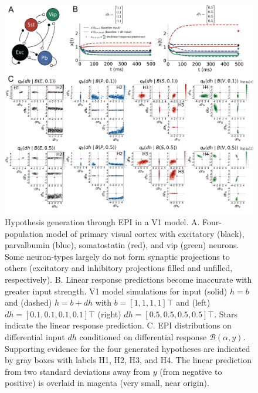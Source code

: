 \documentclass[11pt]{article}
\begin{document}
\begin{figure}
\begin{center}
\includegraphics[scale=0.55]{figures/fig2/fig2.pdf}
\end{center}
\caption{Hypothesis generation through EPI in a V1 model.  A. Four-population model of primary visual cortex with excitatory (black), parvalbumin (blue), somatostatin (red), and vip (green) neurons.   Some neuron-types largely do not form synaptic projections to others  (excitatory and inhibitory projections filled and unfilled, respectively).  B. Linear response predictions become inaccurate with greater input strength.  V1 model simulations for input (solid) $h=b$ and (dashed) $h = b + dh$ with $b = \left[1, 1, 1, 1\right]\top$ and (left) $dh = \left[0.1, 0.1, 0.1, 0.1\right]\top$ (right) $dh = \left[0.5, 0.5, 0.5, 0.5\right]\top$.  Stars indicate the linear response prediction.  C. EPI distributions on differential input $dh$ conditioned on differential response $\mathcal{B}(\alpha, y)$. Supporting evidence for the four generated hypotheses are indicated by gray boxes with labels H1, H2, H3, and H4. The linear prediction from two standard deviations away from $y$ (from negative to positive) is overlaid in magenta (very small, near origin). }
\end{figure}
\end{document}
